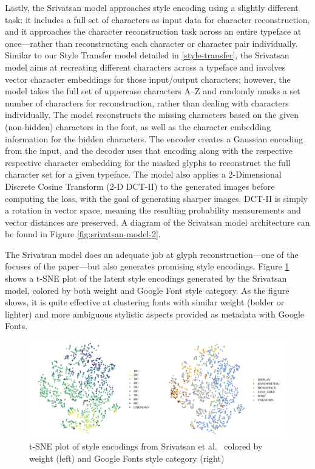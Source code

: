 Lastly, the Srivatsan model approaches style encoding using a slightly different task: it includes a full set of characters as input data for character reconstruction, and it approaches the character reconstruction task across an entire typeface at once---rather than reconstructing each character or character pair individually. Similar to our Style Transfer model detailed in \ref{style-transfer}, the Srivatsan model aims at recreating different characters across a typeface and involves vector character embeddings for those input/output characters; however, the model takes the full set of uppercase characters A--Z and randomly masks a set number of characters for reconstruction, rather than dealing with characters individually. The model reconstructs the missing characters based on the given (non-hidden) characters in the font, as well as the character embedding information for the hidden characters. The encoder creates a Gaussian encoding from the input, and the decoder uses that encoding along with the respective respective character embedding for the masked glyphs to reconstruct the full character set for a given typeface. The model also applies a 2-Dimensional Discrete Cosine Transform (2-D DCT-II) \cite{ahmed1974} to the generated images before computing the loss, with the goal of generating sharper images. DCT-II is simply a rotation in vector space, meaning the resulting probability measurements and vector distances are preserved. A diagram of the Srivatsan model architecture can be found in Figure \ref{fig:srivatsan-model-2}.
 
The Srivatsan model does an adequate job at glyph reconstruction---one of the focuses of the paper---but also generates promising style encodings. Figure \ref{fig:srivatsan-tsne} shows a t-SNE \cite{vandermaaten2008} plot of the latent style encodings generated by the Srivatsan model, colored by both weight and Google Font style category. As the figure shows, it is quite effective at clustering fonts with similar weight (bolder or lighter) and more ambiguous stylistic aspects provided as metadata with Google Fonts.

\begin{figure}[]
    \centering
    \includegraphics[width=\textwidth]{images/srivatsan-tsne.png}
    \caption{t-SNE plot of style encodings from Srivatsan et al.\ \cite{srivatsan2020} colored by weight (left) and Google Fonts style category (right)}
    \label{fig:srivatsan-tsne}
\end{figure}

